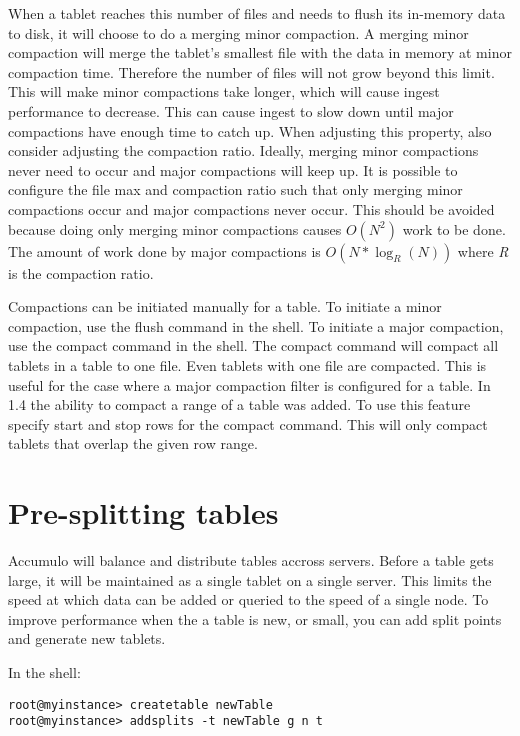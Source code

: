 When a tablet reaches this number of files and needs to flush its in-memory
data to disk, it will choose to do a merging minor compaction.  A merging minor
compaction will merge the tablet's smallest file with the data in memory at
minor compaction time.  Therefore the number of files will not grow beyond this
limit.  This will make minor compactions take longer, which will cause ingest
performance to decrease.  This can cause ingest to slow down until major
compactions have enough time to catch up.   When adjusting this property, also
consider adjusting the compaction ratio. Ideally, merging minor compactions
never need to occur and major compactions will keep up. It is possible to
configure the file max and compaction ratio such that only merging minor
compactions occur and major compactions never occur. This should be avoided
because doing only merging minor compactions causes $O(N^2)$ work to be done.
The amount of work done by major compactions is $O(N*\log_R(N))$ where 
\textit{R} is the compaction ratio.

Compactions can be initiated manually for a table.  To initiate a minor
compaction, use the flush command in the shell.  To initiate a major compaction,
use the compact command in the shell.  The compact command will compact all
tablets in a table to one file.  Even tablets with one file are compacted.  This
is useful for the case where a major compaction filter is configured for a
table. In 1.4 the ability to compact a range of a table was added.  To use this
feature specify start and stop rows for the compact command.  This will only
compact tablets that overlap the given row range.

\section{Pre-splitting tables}

Accumulo will balance and distribute tables accross servers. Before a
table gets large, it will be maintained as a single tablet on a single
server.  This limits the speed at which data can be added or queried
to the speed of a single node. To improve performance when the a table
is new, or small, you can add split points and generate new tablets.

In the shell:

\small
\begin{verbatim}
root@myinstance> createtable newTable
root@myinstance> addsplits -t newTable g n t
\end{verbatim}
\normalsize


